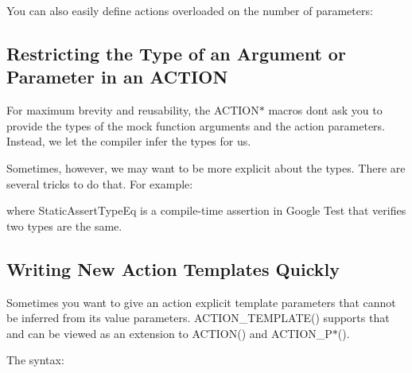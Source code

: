 You can also easily define actions overloaded on the number of parameters\+: 
\begin{DoxyCode}{0}
\end{DoxyCode}


\subsection*{Restricting the Type of an Argument or Parameter in an A\+C\+T\+I\+ON}

For maximum brevity and reusability, the {\ttfamily A\+C\+T\+I\+O\+N$\ast$} macros don\textquotesingle{}t ask you to provide the types of the mock function arguments and the action parameters. Instead, we let the compiler infer the types for us.

Sometimes, however, we may want to be more explicit about the types. There are several tricks to do that. For example\+: 
\begin{DoxyCode}{0}
\DoxyCodeLine{\}}
\DoxyCodeLine{}
\DoxyCodeLine{}
\DoxyCodeLine{\}}
\end{DoxyCode}
 where {\ttfamily Static\+Assert\+Type\+Eq} is a compile-\/time assertion in Google Test that verifies two types are the same.

\subsection*{Writing New Action Templates Quickly}

Sometimes you want to give an action explicit template parameters that cannot be inferred from its value parameters. {\ttfamily A\+C\+T\+I\+O\+N\+\_\+\+T\+E\+M\+P\+L\+A\+T\+E()} supports that and can be viewed as an extension to {\ttfamily A\+C\+T\+I\+O\+N()} and {\ttfamily A\+C\+T\+I\+O\+N\+\_\+\+P$\ast$()}.

The syntax\+: 
\begin{DoxyCode}{0}
\end{DoxyCode}


